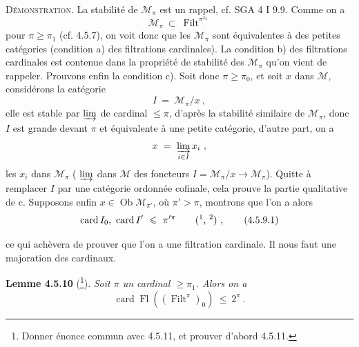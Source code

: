\documentclass[11pt]{article}
\newcommand{\msp}[1]{\marginpar{\footnotesize [#1]}}
\newcommand{\Filt}{\operatorname{Filt}}
\newcommand{\Ob}{\operatorname{Ob}}
\newcommand{\card}{\operatorname{card}}
\newcommand{\Fl}{\operatorname{Fl}}
\begin{document}
\textsc{Démonstration.} La stabilité de $\mathcal{M}_\pi$ est un rappel, cf. SGA 4 I 9.9. Comme on a
\[
\mathcal{M}_\pi \ \subset \ \Filt^{\pi^{\pi_0}}
\]
pour $\pi \geqslant \pi_1$ (cf. 4.5.7), on voit donc que les $\mathcal{M}_\pi$ sont équivalentes à des petites catégories (condition a) des filtrations cardinales). La condition b) des filtrations cardinales est contenue dans la propriété de stabilité des $\mathcal{M}_\pi$ qu'on vient de rappeler. Prouvons enfin la condition c). Soit donc $\pi \geqslant \pi_0$, et soit $x$ dans $\mathcal{M}$, considérons la catégorie
\[
I \ = \ \mathcal{M}_\pi/x \ ,
\]
elle est stable par $\varinjlim$ de cardinal $\leqslant \pi$, d'après la stabilité similaire de $\mathcal{M}_\pi$, donc $I$ est grande devant $\pi$ et équivalente à une petite catégorie, d'autre part, on a
\msp{page 122}
\[
x \ = \ \varinjlim_{i \in I} x_i \ ,
\]
les $x_i$ dans $\mathcal{M}_\pi$ ( $\varinjlim$ dans $\mathcal{M}$ des foncteurs $I = \mathcal{M}_\pi/x \longrightarrow \mathcal{M}_\pi$). Quitte à remplacer $I$ par une catégorie ordonnée cofinale, cela prouve la partie qualitative de c. Supposons enfin $x \in \Ob \mathcal{M}_{\pi'}$, où $\pi' > \pi$, montrons que l'on a alors
\[
\card I_0, \ \card I' \ \leqslant \ \pi'^{\pi} \qquad \text{(\footnotemark, \footnotemark)} \ , \tag*{(4.5.9.1)}
\]
\addtocounter{footnote}{-1}%
%
%
%
ce qui achèvera de prouver que l'on a une filtration cardinale. Il nous faut une majoration des cardinaux.

\textbf{Lemme 4.5.10} (\footnote{Donner énonce commun avec 4.5.11, et prouver d'abord 4.5.11.}). \textit{Soit $\pi$ un cardinal $\geqslant \pi_1$. Alors on a} %
\[
\card \Fl((\Filt^\pi)_0) \ \leqslant \ 2^\pi \ . \tag*{(4.5.10.1)}
\]
\end{document}
